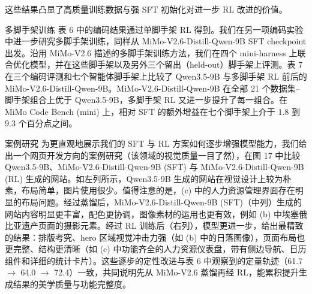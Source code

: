 \documentclass[
  10
]{article}
\begin{document}
这些结果凸显了高质量训练数据与强 SFT 初始化对进一步 RL 改进的价值。

多脚手架训练 表 6 中的编码结果通过单脚手架 RL 得到。我们在另一项编码实验中进一步研究多脚手架训练，同样从 MiMo-V2.6-Distill-Qwen-9B SFT checkpoint 出发。沿用 MiMo-V2.6 描述的多脚手架训练方法，我们在四个 mini-harness 上联合优化模型，并在这些脚手架以及另外三个留出（held-out）脚手架上评测。表 7 在三个编码评测和七个智能体脚手架上比较了 Qwen3.5-9B 与多脚手架 RL 前后的 MiMo-V2.6-Distill-Qwen-9B。MiMo-V2.6-Distill-Qwen-9B 在全部 21 个数据集--脚手架组合上优于 Qwen3.5-9B，多脚手架 RL 又进一步提升了每一组合。在 MiMo Code Bench (mini) 上，相对 SFT 的额外增益在七个脚手架上介于 1.8 到 9.3 个百分点之间。

案例研究 为更直观地展示我们的 SFT 与 RL 方案如何逐步增强模型能力，我们给出一个网页开发方向的案例研究（该领域的视觉质量一目了然），在图 17 中比较 Qwen3.5-9B、MiMo-V2.6-Distill-Qwen-9B (SFT) 与 MiMo-V2.6-Distill-Qwen-9B (RL) 生成的网站。如左列所示，Qwen3.5-9B 生成的网站在视觉设计上较为朴素，布局简单，图片使用很少。值得注意的是，(c) 中的人力资源管理界面存在明显的布局问题。经过蒸馏后，MiMo-V2.6-Distill-Qwen-9B (SFT)（中列）生成的网站内容明显更丰富，配色更协调，图像素材的运用也更有效，例如 (b) 中埃塞俄比亚遗产页面的摄影元素。经过 RL 训练后（右列），模型更进一步，给出最精致的结果：排版考究、hero 区域视觉冲击力强（如 (b) 中的日落图像），页面布局也更完整、结构更清晰（如 (c) 中功能齐全的人力资源仪表盘，带有侧边导航、日历组件和详细的统计卡片）。这些逐步的定性改进与表 6 中观察到的定量轨迹（61.7 $\to$ 64.0 $\to$ 72.4）一致，共同说明先从 MiMo-V2.6 蒸馏再经 RL，能累积提升生成结果的美学质量与功能完整度。
\end{document}
